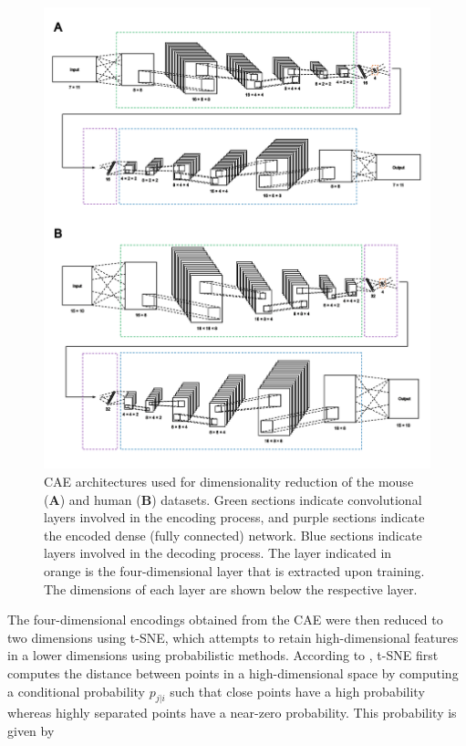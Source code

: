 \documentclass[12pt,oneside,onecolumn,a4paper]{article}
\begin{document}
\begin{figure}[H]
\begin{center}
\includegraphics[width=\columnwidth]{figures/CAE}
\caption{CAE architectures used for dimensionality reduction of the mouse (\textbf{A}) and human (\textbf{B}) datasets. Green sections indicate convolutional layers involved in the encoding process, and purple sections indicate the encoded dense (fully connected) network. Blue sections indicate layers involved in the decoding process. The layer indicated in orange is the four-dimensional layer that is extracted upon training. The dimensions of each layer are shown below the respective layer. \label{fig:CAE}%
}
\end{center}
\end{figure}

The four-dimensional encodings obtained from the CAE were then reduced to two dimensions using t-SNE, which attempts to retain high-dimensional features in a lower dimensions using probabilistic methods. According to  \cite{Maaten2008VisualizingDU}, t-SNE first computes the distance between points in a high-dimensional space by computing a conditional probability $p_{j|i}$ such that close points have a high probability whereas highly separated points have a near-zero probability. This probability is given by
\end{document}
